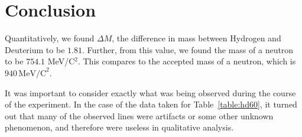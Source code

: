 \documentclass[paper=a4, fontsize=11pt]{scrartcl} %
\numberwithin{equation}{section}
\numberwithin{figure}{section}
\numberwithin{table}{section}
\begin{document}














\section{Conclusion}

Quantitatively, we found $\Delta M$, the difference in mass between Hydrogen and Deuterium to be $1.81$. Further, from this value, we found the mass of a neutron to be $754.1$ MeV/C$^2$. This compares to the accepted mass of a neutron, which is $940 \, \mathrm{MeV/C}^2$.

It was important to consider exactly what was being observed during the course of the experiment. In the case of the data taken for Table~\ref{table:hd60}, it turned out that many of the observed lines were artifacts or some other unknown phenomenon, and therefore were useless in qualitative analysis.
\end{document}
